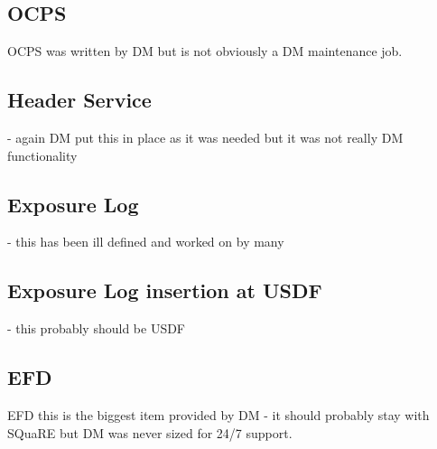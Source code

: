 \subsection{ \gls{OCPS} }
\gls{OCPS} was  written by \gls{DM} but is  not obviously a \gls{DM} maintenance job.

\subsection{ Header Service }
- again \gls{DM} put this in place as it was  needed but it was not really \gls{DM} functionality

\subsection{ Exposure Log}
 - this has been ill defined and worked on by many

\subsection{ Exposure Log  insertion at \gls{USDF}}
 - this probably  should be \gls{USDF}

\subsection{ \gls{EFD}}
 EFD this is the biggest item provided by \gls{DM} - it should probably stay with SQuaRE but \gls{DM} was never sized for 24/7 support.


